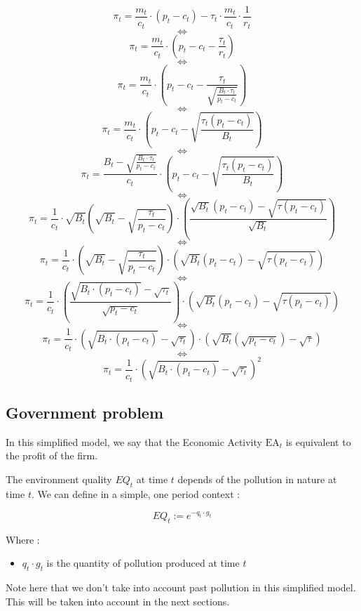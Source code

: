 \documentclass{article}
\begin{document}
$$\pi_{t}= \frac{m_{t}}{c_{t}}\cdot\left(p_{t}-c_{t}\right)-\tau_{t}\cdot \frac{m_{t}}{c_{t}}\cdot \frac{1}{r_{t}}$$
$$\iff$$
$$\pi_{t}=\frac{m_{t}}{c_{t}}\cdot\left(p_{t}-c_{t}-\frac{\tau_{t}}{r_{t}}\right)$$
$$\iff$$
$$\pi_{t}=\frac{m_{t}}{c_{t}}\cdot\left(p_{t}-c_{t}-\frac{\tau_{t}}{\sqrt{\frac{B_{t}\cdot \tau_{t}}{p_{t}-c_{t}}}}\right)$$
$$\iff$$
$$\pi_{t}=\frac{m_{t}}{c_{t}}\cdot\left(p_{t}-c_{t}-\sqrt{\frac{\tau_{t}(p_{t}-c_{t})}{B_{t}}}\right)$$
$$\iff$$
$$\pi_{t}=\frac{B_{t}-\sqrt{\frac{B_{t}\cdot \tau_{t}}{p_{t}-c_{t}}}}{c_{t}}\cdot\left(p_{t}-c_{t}-\sqrt{\frac{\tau_{t}(p_{t}-c_{t})}{B_{t}}}\right)$$
$$\iff$$
$$\pi_{t}=\frac{1}{c_{t}}\cdot\sqrt{B_{t}}\left(\sqrt{B_{t}}-\sqrt{\frac{\tau_{t}}{p_{t}-c_{t}}}\right)\cdot\left(\frac{\sqrt{B_{t}}(p_{t}-c_{t})-\sqrt{\tau(p_{t}-c_{t})}}{\sqrt{B_{t}}}\right)$$
$$\iff$$
$$\pi_{t}=\frac{1}{c_{t}}\cdot\left(\sqrt{B_{t}}-\sqrt{\frac{\tau_{t}}{p_{t}-c_{t}}}\right)\cdot\left(\sqrt{B_{t}}(p_{t}-c_{t})-\sqrt{\tau(p_{t}-c_{t})}\right)$$
$$\iff$$
$$\pi_{t}=\frac{1}{c_{t}}\cdot\left(\frac{\sqrt{B_{t}\cdot (p_{t}-c_{t})}-\sqrt{\tau_{t}}}{\sqrt{p_{t}-c_{t}}}\right)\cdot\left(\sqrt{B_{t}}(p_{t}-c_{t})-\sqrt{\tau(p_{t}-c_{t})}\right)$$
$$\iff$$
$$\pi_{t}=\frac{1}{c_{t}}\cdot\left({\sqrt{B_{t}\cdot (p_{t}-c_{t})}-\sqrt{\tau_{t}}}\right)\cdot\left(\sqrt{B_{t}}(\sqrt{p_{t}-c_{t}})-\sqrt{\tau}\right)$$
$$\iff$$
$$\pi_{t}=\frac{1}{c_{t}}\cdot\left({\sqrt{B_{t}\cdot (p_{t}-c_{t})}-\sqrt{\tau_{t}}}\right)^{2}$$

\subsection{Government problem}

In this simplified model, we say that the Economic Activity $\text{EA}_{t}$ is equivalent to the profit of the firm.

The environment quality $EQ_{t}$ at time $t$ depends of the pollution in nature at time $t$. We can define in a simple, one period context : 

\begin{equation}
    EQ_{t}:=e^{-q_{t}\cdot g_{t}}
\end{equation}

Where :
\begin{itemize}
    \item $q_{t}\cdot g_{t}$ is the quantity of pollution produced at time $t$
\end{itemize}

Note here that we don't take into account past pollution in this simplified model. This will be taken into account in the next sections. 
\end{document}
